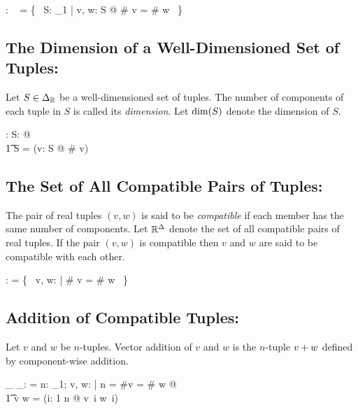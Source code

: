\documentclass[11pt, oneside]{article}
\begin{document}
\begin{axdef}
	\DeltaRinf: \family~\Rinf
\where
	\DeltaRinf = \{~ S: \power_1 \Rinf | \forall v, w: S @ \# v = \# w ~\}
\end{axdef}

\subsection{The Dimension of a Well-Dimensioned Set of Tuples: }

Let $S \in \Delta_{\mathbb{R}}$ be a well-dimensioned set of tuples.
The number of components of each tuple in $S$ is called its \textit{dimension}.
Let $\operatorname{dim}(S)$ denote the dimension of $S$.

\begin{axdef}
\dimRinf: \DeltaRinf \fun \nat
\where
\forall S: \DeltaRinf @ \\
\t1	\dimRinf S = (\mu v: S @ \# v)
\end{axdef}

\subsection{The Set of All Compatible Pairs of Tuples: }

The pair of real tuples $(v, w)$ is said to be \textit{compatible} if each member has the same number of components.
Let $\mathbb{R}^\Delta$ denote the set of all compatible pairs of real tuples.
If the pair $(v, w)$ is compatible then $v$ and $w$ are said to be compatible with each other.

\begin{axdef}
	\RinfDelta: \Rinf \rel \Rinf
\where
	\RinfDelta = \{~ v, w: \Rinf | \# v = \# w ~\}
\end{axdef}

\subsection{Addition of Compatible Tuples: }

Let $v$ and $w$ be $n$-tuples.
Vector addition of $v$ and $w$ is the $n$-tuple $v \mathbin{+} w$ defined by component-wise addition.

\begin{axdef}
	\_ \addRinf \_: \RinfDelta \fun \Rinf
\where
	\langle \rangle \addRinf \langle \rangle = \langle \rangle
\also
\forall n: \nat_1; v, w: \Rinf | n = \#v = \# w @ \\
\t1	v \addRinf w = (\lambda i: 1 \upto n @ v~i \addR w~i)
\end{axdef}
\end{document}
